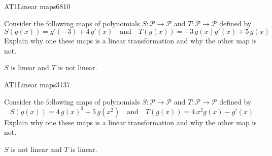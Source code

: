 \begin{exercise}{AT1}{Linear maps}{6810} 
\begin{exerciseStatement} 

 Consider the following maps of polynomials \(S:\mathcal{P}\rightarrow\mathcal{P}\) and \(T:\mathcal{P}\rightarrow\mathcal{P}\) defined by \[
            S(g(x))=
                    g'\left(-3\right) + 4 \, g'\left(x\right)
                \hspace{1em} \text{and} \hspace{1em}
            T(g(x))=
                    -3 \, g\left(x\right) g'\left(x\right) + 5 \, g\left(x\right)
        \] Explain why one these maps is a linear transformation and why the other map is not. 

 \end{exerciseStatement}
 \begin{exerciseAnswer} 

\(S\) is linear and \(T\) is not linear.

 \end{exerciseAnswer}
 \end{exercise}


\begin{exercise}{AT1}{Linear maps}{3137} 
\begin{exerciseStatement} 

 Consider the following maps of polynomials \(S:\mathcal{P}\rightarrow\mathcal{P}\) and \(T:\mathcal{P}\rightarrow\mathcal{P}\) defined by \[
            S(g(x))=
                    4 \, g\left(x\right)^{3} + 5 \, g\left(x^{2}\right)
                \hspace{1em} \text{and} \hspace{1em}
            T(g(x))=
                    4 \, x^{2} g\left(x\right) - g'\left(x\right)
        \] Explain why one these maps is a linear transformation and why the other map is not. 

 \end{exerciseStatement}
 \begin{exerciseAnswer} 

\(S\) is not linear and \(T\) is linear.

 \end{exerciseAnswer}
 \end{exercise}


